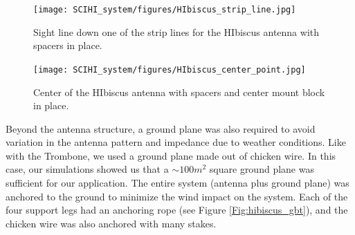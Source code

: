 \begin{figure}[htb]
\centering
\begin{minipage}[b]{0.52\textwidth}
\centering
\texttt{[image: SCIHI\_system/figures/HIbiscus\_strip\_line.jpg]}
\caption{Sight line down one of the strip lines for the HIbiscus antenna with spacers in place.}
\label{Fig:hibiscus_spacer}
\end{minipage}%
\begin{minipage}[b]{0.02\textwidth}
\hspace{1cm}
\end{minipage}%
\begin{minipage}[b]{0.42\textwidth}
\centering
\texttt{[image: SCIHI\_system/figures/HIbiscus\_center\_point.jpg]}
\caption{Center of the HIbiscus antenna with spacers and center mount block in place.}
\label{Fig:hibiscus_center}
\end{minipage}
\end{figure}

Beyond the antenna structure, a ground plane was also required to avoid variation in the antenna pattern and impedance due to weather conditions. Like with the Trombone, we used a ground plane made out of chicken wire. In this case, our simulations showed us that a $\sim 100 m^2$ square ground plane was sufficient for our application. The entire system (antenna plus ground plane) was anchored to the ground to minimize the wind impact on the system. Each of the four support legs had an anchoring rope (see Figure \ref{Fig:hibiscus_gbt}), and the chicken wire was also anchored with many stakes. 


